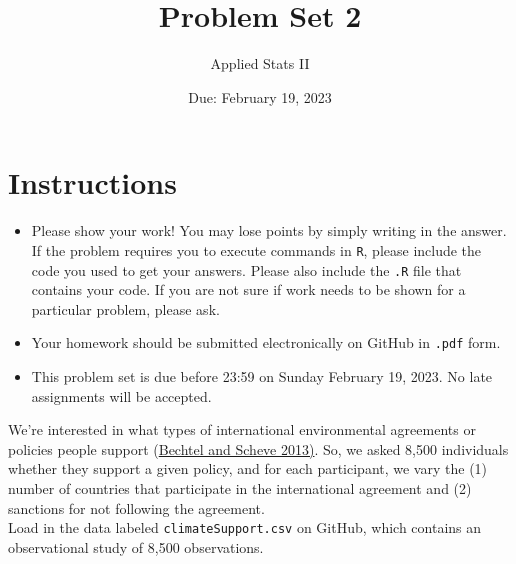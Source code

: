 \documentclass[12pt,letterpaper]{article}
\title{Problem Set 2}
\date{Due: February 19, 2023}
\author{Applied Stats II}
\begin{document}
	\maketitle
	\section*{Instructions}
	\begin{itemize}
		\item Please show your work! You may lose points by simply writing in the answer. If the problem requires you to execute commands in \texttt{R}, please include the code you used to get your answers. Please also include the \texttt{.R} file that contains your code. If you are not sure if work needs to be shown for a particular problem, please ask.
		\item Your homework should be submitted electronically on GitHub in \texttt{.pdf} form.
		\item This problem set is due before 23:59 on Sunday February 19, 2023. No late assignments will be accepted.
	\end{itemize}
	
	
	
	
	\vspace{.25cm}
\noindent We're interested in what types of international environmental agreements or policies people support (\href{https://www.pnas.org/content/110/34/13763}{Bechtel and Scheve 2013)}. So, we asked 8,500 individuals whether they support a given policy, and for each participant, we vary the (1) number of countries that participate in the international agreement and (2) sanctions for not following the agreement. \\

\noindent Load in the data labeled \texttt{climateSupport.csv} on GitHub, which contains an observational study of 8,500 observations.
\end{document}

